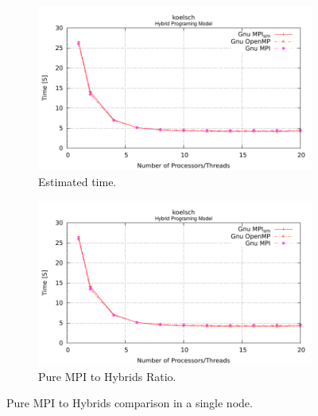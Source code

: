 \begin{figure} [h!]
    \centering
    \captionsetup{justification=centering, singlelinecheck=false}
    \begin{subfigure}{.6\textwidth}
      \centering
      \hspace*{-1.5cm} 
      \includegraphics[page=1,width=0.95\linewidth]{Plots/HybridProgramming/koelsch_Gnu.pdf}
      \caption[]{Estimated time.}
      \label{fig:HybridSingleNodeComparison}
    \end{subfigure}%
    \begin{subfigure}{.6\textwidth}
      \centering
      \hspace*{-1.5cm} 
      \includegraphics[page=2,width=0.95\linewidth]{Plots/HybridProgramming/koelsch_Gnu.pdf}
      \caption{Pure MPI to Hybrids Ratio.}
      \label{fig:HybridSingleNodeRatioComparison}
    \end{subfigure}%
\caption{Pure MPI to Hybrids comparison in a single node.}
\label{fig:HybridSingleNode}
\end{figure}



